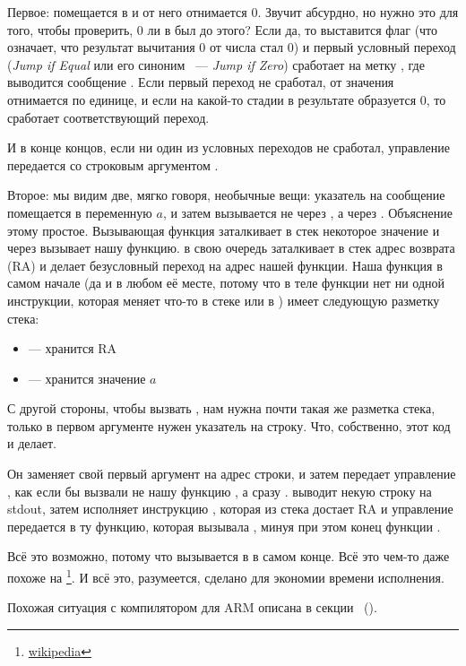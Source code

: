 Первое:  помещается в \EAX и от него отнимается 0. Звучит абсурдно, но нужно это для того, чтобы проверить, 
0 ли в \EAX был до этого? Если да, то выставится флаг \ZF (что означает, что результат вычитания 0 от числа 
стал 0) и первый условный переход \JE (\emph{Jump if Equal} или его синоним \JZ~--- \emph{Jump if Zero}) 
сработает на метку , где выводится сообщение .
Если первый переход не сработал, от значения отнимается по единице, 
и если на какой-то стадии в результате образуется 0, то сработает соответствующий переход.

И в конце концов, если ни один из условных переходов не сработал, управление передается \printf
со строковым аргументом .

\label{jump_to_last_printf}
\myindex{\Stack}
Второе: мы видим две, мягко говоря, необычные вещи: указатель на сообщение помещается в переменную $a$, 
и затем \printf вызывается не через \CALL, а через \JMP. Объяснение этому простое. 
Вызывающая функция заталкивает в стек некоторое значение и через \CALL вызывает нашу функцию. 
\CALL в свою очередь заталкивает в стек адрес возврата (\ac{RA}) и делает безусловный переход на адрес нашей функции. 
Наша функция в самом начале (да и в любом её месте, потому что в теле функции нет ни одной инструкции, 
которая меняет что-то в стеке или в \ESP) имеет следующую разметку стека:

\begin{itemize}
\item\ESP --- хранится \ac{RA}
\item{} --- хранится значение $a$ 
\end{itemize}

С другой стороны, чтобы вызвать \printf, нам нужна почти такая же разметка стека, 
только в первом аргументе нужен указатель на строку. Что, собственно, этот код и делает.

Он заменяет свой первый аргумент на адрес строки, и затем передает управление \printf, как если бы вызвали не 
нашу функцию \ttf, а сразу \printf. 
\printf выводит некую строку на \gls{stdout}, затем исполняет инструкцию \RET, 
которая из стека достает \ac{RA} и управление передается в ту функцию, 
которая вызывала \ttf, минуя при этом конец функции \ttf.

\newcommand{\URLSJ}{\href{http://en.wikipedia.org/wiki/Setjmp.h}{wikipedia}}
Всё это возможно, потому что \printf вызывается в \ttf в самом конце. 
Всё это чем-то даже похоже на \footnote{\URLSJ}.
И всё это, разумеется, сделано для экономии времени исполнения.

Похожая ситуация с компилятором для ARM описана в секции \q{\PrintfSeveralArgumentsSectionName}~().



